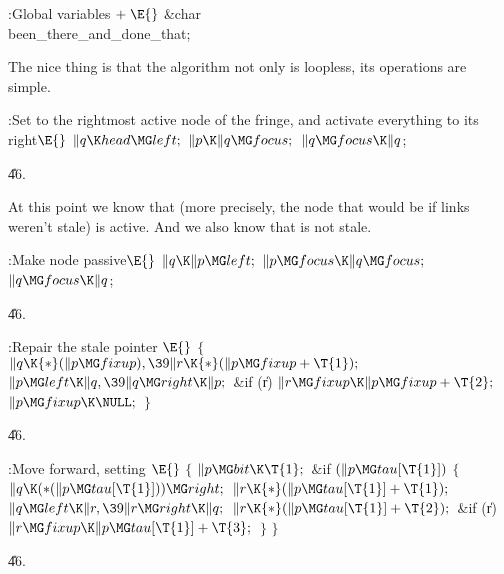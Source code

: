 \B{}:Global variables\X${}\mathrel+\E{}$\6
\&{char} \\{been\_there\_and\_done\_that};\par
\fi

The nice thing is that the algorithm not only is loopless, its
operations are simple.

\Y\B\4:Set  to the rightmost active node of the fringe, and
activate everything to its right\X${}\E{}$\6
$\|q\K\\{head}\MG\\{left};{}$\6
${}\|p\K\|q\MG\\{focus};{}$\6
${}\|q\MG\\{focus}\K\|q{}$;\par
\U46.\fi

At this point we know that  (more precisely, the
node that would be  if links weren't stale) is active.
And we also know that  is not stale.

\Y\B\4:Make node  passive\X${}\E{}$\6
$\|q\K\|p\MG\\{left};{}$\6
${}\|p\MG\\{focus}\K\|q\MG\\{focus};{}$\6
${}\|q\MG\\{focus}\K\|q{}$;\par
\U46.\fi

\B{}:Repair the stale pointer \X${}\E{}$\6
${}\{{}$\1\6
${}\|q\K{*}(\|p\MG\\{fixup}),\39\|r\K{*}(\|p\MG\\{fixup}+\T{1});{}$\6
${}\|p\MG\\{left}\K\|q,\39\|q\MG\\{right}\K\|p;{}$\6
\&{if} (\|r)\1\5
${}\|r\MG\\{fixup}\K\|p\MG\\{fixup}+\T{2};{}$\2\6
${}\|p\MG\\{fixup}\K\NULL;{}$\6
\4${}\}{}$\2\par
\U46.\fi

\B{}:Move forward, setting \X${}\E{}$\6
${}\{{}$\1\6
${}\|p\MG\\{bit}\K\T{1};{}$\6
\&{if} ${}(\|p\MG\\{tau}[\T{1}]){}$\5
${}\{{}$\1\6
${}\|q\K({*}(\|p\MG\\{tau}[\T{1}]))\MG\\{right};{}$\6
${}\|r\K{*}(\|p\MG\\{tau}[\T{1}]+\T{1});{}$\6
${}\|q\MG\\{left}\K\|r,\39\|r\MG\\{right}\K\|q;{}$\6
${}\|r\K{*}(\|p\MG\\{tau}[\T{1}]+\T{2});{}$\6
\&{if} (\|r)\1\5
${}\|r\MG\\{fixup}\K\|p\MG\\{tau}[\T{1}]+\T{3};{}$\2\6
\4${}\}{}$\2\6
\4${}\}{}$\2\par
\U46.\fi

